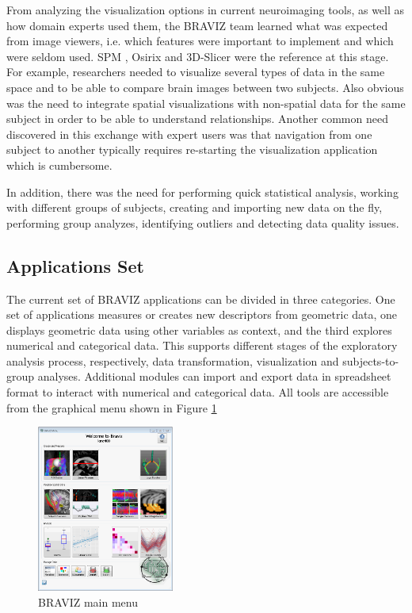 \documentclass[twocolumn]{svjour3}
\begin{document}
From analyzing the visualization options in current neuroimaging tools, as well as how domain experts used them, the BRAVIZ team learned what was expected from image viewers, i.e. which features were important to implement and which were seldom used. SPM \cite{friston_statistical_2007}, Osirix \cite{rosset_osirix:_2004} and 3D-Slicer \cite{fedorov_3d_2012} were the reference at this stage. For example, researchers needed to visualize several types of data in the same space and to be able to compare brain images between two subjects. Also obvious was the need to integrate spatial visualizations with non-spatial data for the same subject in order to be able to understand relationships. Another common need discovered in this exchange with expert users was that navigation from one subject to another typically requires re-starting the visualization application which is cumbersome. 

In addition, there was the need for performing quick statistical analysis, working with different groups of subjects, creating and importing new data on the fly, performing group analyzes, identifying outliers and detecting data quality issues. 



\subsection{Applications Set}


The current set of BRAVIZ applications can be divided in three categories. One set of applications measures or creates new descriptors from geometric data, one displays geometric data using other variables as context, and the third explores numerical and categorical data. This supports different stages of the exploratory analysis process, respectively, data transformation, visualization and subjects-to-group analyses. Additional modules can import and export data in spreadsheet format to interact with numerical and categorical data. All tools  are accessible from the graphical menu shown in Figure \ref{fig_menu}

\begin{figure}
\begin{center}
\includegraphics[width=0.4\textwidth]{braviz_menu}
\end{center}
 \caption{\label{fig_menu} BRAVIZ main menu }
\end{figure}
\end{document}
